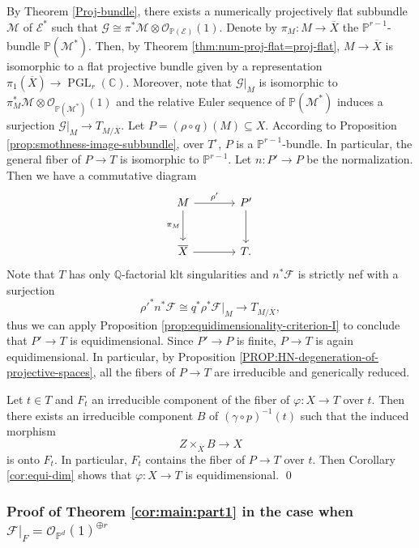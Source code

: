 \documentclass[english,reqno]{amsart}
\newcommand\bbC{{\mathbb C}}
\newcommand\bbP{{\mathbb P}}
\newcommand\bbQ{{\mathbb Q}}
\newcommand\sE{{\mathscr E}}
\newcommand\sF{{\mathscr F}}
\newcommand\sG{{\mathscr G}}
\newcommand\sM{{\mathscr M}}
\newcommand\sO{{\mathscr O}}
\DeclareMathOperator*{\PGL}{PGL}
\theoremstyle{plain}
\theoremstyle{definition}
\numberwithin{equation}{section} %
\begin{document}
By Theorem \ref{Proj-bundle},  there exists a numerically projectively flat subbundle $\sM$ of $\sE^*$ such that $\sG\cong  \pi^*\sM\otimes\sO_{\bbP(\sE)}(1)$.
Denote by $\pi_M\colon M\rightarrow \overline{X}$ the $\bbP^{r-1}$-bundle $\bbP(\sM^*)$. Then, by Theorem \ref{thm:num-proj-flat=proj-flat}, $M\rightarrow \overline{X}$ is isomorphic to a flat projective bundle  given by a representation $\pi_1(\overline{X})\rightarrow \PGL_{r}(\bbC)$. Moreover,  note that  $\sG\vert_{M}$ is isomorphic to $\pi_M^*\sM\otimes \sO_{\bbP(\sM^*)}(1)$ and the relative Euler sequence of $\bbP(\sM^*)$ induces a surjection $\sG\vert_{M}\rightarrow T_{M/\overline{X}}$. Let $P = (\rho\circ q)(M) \subseteq X$. According to Proposition \ref{prop:smothness-image-subbundle}, over $T^\circ$, $P$ is a $\bbP^{r-1}$-bundle. In particular, the general fiber of $P\rightarrow T$ is isomorphic to $\bbP^{r-1}$. Let $n\colon P'\rightarrow P$ be the normalization. Then we have a commutative diagram
\[
\begin{tikzcd}[column sep=large, row sep=large]
M\dar[swap]{\pi_M} \rar{\rho'} &  P'\dar{} \\
\overline{X} \rar& T.
\end{tikzcd}
\]
Note that $T$ has only $\bbQ$-factorial klt singularities and $n^*\sF$ is strictly nef with a surjection 
$$
\rho'^*n^*\sF\cong q^*\rho^*\sF\vert_M\rightarrow T_{M/\overline{X}},
$$
thus we can apply Proposition \ref{prop:equidimensionality-criterion-I} to conclude that $P'\rightarrow T$ is equidimensional.
Since $P'\rightarrow P$ is finite, $P\rightarrow T$ is again equidimensional.
In particular, by Proposition \ref{PROP:HN-degeneration-of-projective-spaces}, all the fibers of $P\rightarrow T$ are irreducible and generically reduced.

Let $t\in T$ and $F_t$  an irreducible component of the fiber of $\varphi\colon X\rightarrow T$ over $t$. Then there exists an irreducible component $B$ of $(\gamma\circ p)^{-1}(t)$ such that the induced morphism
\[
Z\times_{\overline{X}} B\rightarrow X
\]
is onto $F_t$. In particular, $F_t$ contains the fiber of $P\rightarrow T$ over $t$. Then Corollary \ref{cor:equi-dim} shows that $\varphi\colon X\rightarrow T$ is equidimensional. \hfil\qed




\subsubsection{Proof of Theorem  \ref{cor:main:part1}   in the case when $\sF\vert_F=\sO_{\bbP^d}(1)^{\oplus r}$}
\end{document}
